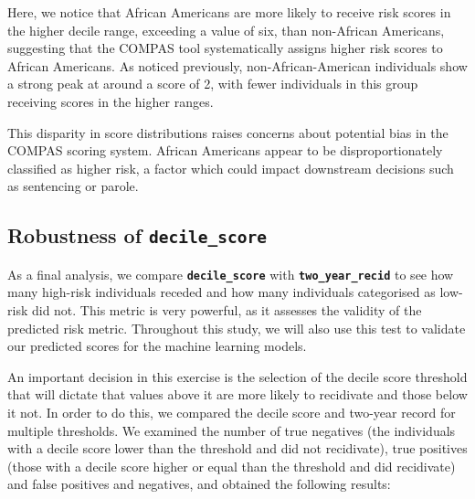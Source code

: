 \documentclass[conference]{IEEEtran}
\begin{document}
	
	Here, we notice that African Americans are more likely to receive risk scores in the higher decile range, exceeding a value of six, than non-African Americans, suggesting that the COMPAS tool systematically assigns higher risk scores to African Americans. As noticed previously, non-African-American individuals show a strong peak at around a score of 2, with fewer individuals in this group receiving scores in the higher ranges.
	
	This disparity in score distributions raises concerns about potential bias in the COMPAS scoring system. African Americans appear to be disproportionately classified as higher risk, a factor which could impact downstream decisions such as sentencing or parole.
	
	\subsection{Robustness of \textbf{\texttt{decile\_score}}}
	
	As a final analysis, we compare \textbf{\texttt{decile\_score}} with \textbf{\texttt{two\_year\_recid}} to see how many high-risk individuals receded and how many individuals categorised as low-risk did not. This metric is very powerful, as it assesses the validity of the predicted risk metric. Throughout this study, we will also use this test to validate our predicted scores for the machine learning models.
	
	
	An important decision in this exercise is the selection of the decile score threshold that will dictate that values above it are more likely to recidivate and those below it not. In order to do this, we compared the decile score and two-year record for multiple thresholds. We examined the number of true negatives (the individuals with a decile score lower than the threshold and did not recidivate), true positives (those with a decile score higher or equal than the threshold and did recidivate) and false positives and negatives, and obtained the following results:
	
\end{document}
